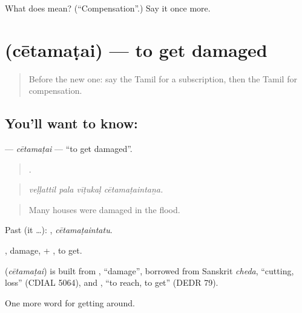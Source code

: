 \begin{tcolorbox}[breakable,colback=teal!4,colframe=teal!35!black,title={Before you move on}]
What does  mean? (\textquotedblleft{}Compensation\textquotedblright{}.) Say it once more.
\end{tcolorbox}
\section[\texorpdfstring{\ta{சேதமடை} (cētamaṭai)}{சேதமடை (cētamaṭai)}]{ (cētamaṭai) — to get damaged}

\label{lesson:TA-C451-cetamatai}



\begin{quote}
Before the new one: say the Tamil for a subscription, then the Tamil for compensation.
\end{quote}

\subsection*{You'll want to know: }
\textbf{} — \emph{cētamaṭai} — \textquotedblleft{}to get damaged\textquotedblright{}.

\begin{quote}
   .
\end{quote}

\begin{quote}
\emph{veḷḷattil pala vīṭukaḷ cētamaṭaintaṉa.}
\end{quote}

\begin{quote}
Many houses were damaged in the flood.
\end{quote}

Past (it …): , \emph{cētamaṭaintatu}.

, damage, + , to get.

\begin{cousinweb}
\textbf{} (\emph{cētamaṭai}) is built from , \textquotedblleft{}damage\textquotedblright{}, borrowed from Sanskrit \emph{cheda}, \textquotedblleft{}cutting, loss\textquotedblright{} (CDIAL 5064), and , \textquotedblleft{}to reach, to get\textquotedblright{} (DEDR 79).
\end{cousinweb}

\begin{grammarlens}[title={What you've built}]
One more word for getting around.
\end{grammarlens}

